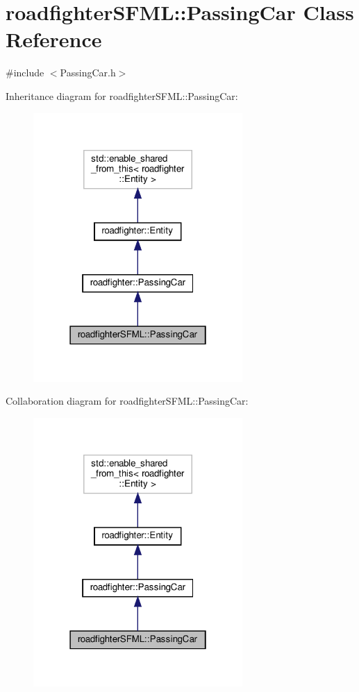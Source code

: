 \hypertarget{classroadfighterSFML_1_1PassingCar}{}\section{roadfighter\+S\+F\+ML\+:\+:Passing\+Car Class Reference}
\label{classroadfighterSFML_1_1PassingCar}


{\ttfamily \#include $<$Passing\+Car.\+h$>$}



Inheritance diagram for roadfighter\+S\+F\+ML\+:\+:Passing\+Car\+:\nopagebreak
\begin{figure}[H]
\begin{center}
\leavevmode
\includegraphics[width=226pt]{classroadfighterSFML_1_1PassingCar__inherit__graph}
\end{center}
\end{figure}


Collaboration diagram for roadfighter\+S\+F\+ML\+:\+:Passing\+Car\+:\nopagebreak
\begin{figure}[H]
\begin{center}
\leavevmode
\includegraphics[width=226pt]{classroadfighterSFML_1_1PassingCar__coll__graph}
\end{center}
\end{figure}
